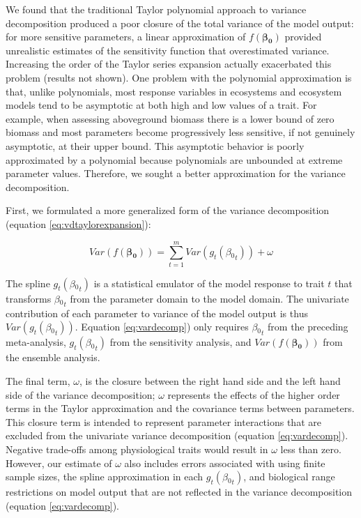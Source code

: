 \documentclass[12pt]{article}
\renewcommand{\vec}[1]{\bm{#1}} %
\begin{document}
\begin{flushleft}
\begin{spacing}{1.9}
 We found that the traditional Taylor polynomial approach to variance decomposition produced a poor closure of the total variance of the model output: for more sensitive parameters, a linear approximation of $f(\vec{\beta{_0}})$ provided unrealistic estimates of the sensitivity function that overestimated variance. 
 Increasing the order of the Taylor series expansion actually exacerbated this problem (results not shown).
 One problem with the polynomial approximation is that, unlike polynomials, most response variables in ecosystems and ecosystem models tend to be asymptotic at both high and low values of a trait.
 For example, when assessing aboveground biomass there is a lower bound of zero biomass and most parameters become progressively less sensitive, if not genuinely asymptotic, at their upper bound.
 This asymptotic behavior is poorly approximated by a polynomial because polynomials are unbounded at extreme parameter values.
 Therefore, we sought a better approximation for the variance decomposition.

 First, we formulated a more generalized form of the variance decomposition (equation \ref{eq:vdtaylorexpansion}):

 \begin{equation}\label{eq:vardecomp}
   Var(f(\vec{\beta{_0}})) = \sum_{t=1}^{m}{Var(g_t(\beta{_0}_t))} + \omega
 \end{equation}


 The spline $g_t(\beta{_0}_t)$ is a statistical emulator of the model response to trait $t$ that transforms $\beta{_0}_t$ from the parameter domain to the model domain.
 The univariate contribution of each parameter to variance of the model output is thus $Var(g_t(\beta{_0}_t))$.
 Equation \ref{eq:vardecomp}) only requires $\beta{_0}_t$ from the preceding meta-analysis, $g_t(\beta{_0}_t)$ from the sensitivity analysis, and $Var(f(\vec{\beta{_0}}))$ from the ensemble analysis.
 
 The final term, $\omega$, is the closure between the right hand side and the left hand side of the variance decomposition; $\omega$ represents the effects of the higher order terms in the Taylor approximation and the covariance terms between parameters.
 This closure term is intended to represent parameter interactions that are excluded from the univariate variance decomposition (equation \ref{eq:vardecomp}).
 Negative trade-offs among physiological traits would result in $\omega$ less than zero.
 However, our estimate of $\omega$ also includes errors associated with using finite sample sizes, the spline approximation in each $g_t(\beta{_0}_t)$, and biological range restrictions on model output that are not reflected in the variance decomposition (equation \ref{eq:vardecomp}).


\end{spacing}
\end{flushleft}
\end{document}
